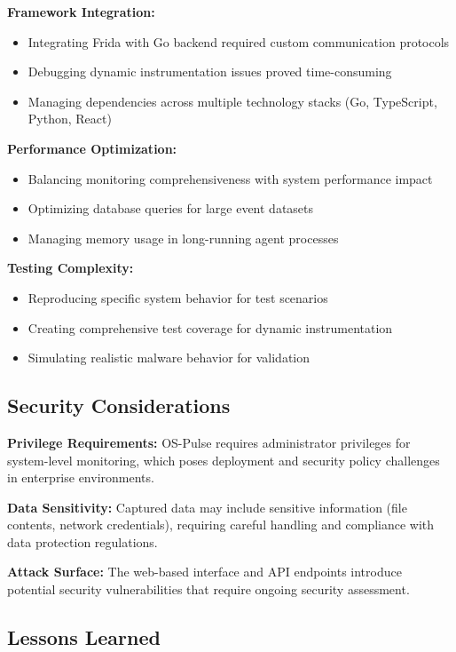 \textbf{Framework Integration:}
\begin{itemize}
    \item Integrating Frida with Go backend required custom communication protocols
    \item Debugging dynamic instrumentation issues proved time-consuming
    \item Managing dependencies across multiple technology stacks (Go, TypeScript, Python, React)
\end{itemize}

\textbf{Performance Optimization:}
\begin{itemize}
    \item Balancing monitoring comprehensiveness with system performance impact
    \item Optimizing database queries for large event datasets
    \item Managing memory usage in long-running agent processes
\end{itemize}

\textbf{Testing Complexity:}
\begin{itemize}
    \item Reproducing specific system behavior for test scenarios
    \item Creating comprehensive test coverage for dynamic instrumentation
    \item Simulating realistic malware behavior for validation
\end{itemize}

\subsection{Security Considerations}

\textbf{Privilege Requirements:}
OS-Pulse requires administrator privileges for system-level monitoring, which poses deployment and security policy challenges in enterprise environments.

\textbf{Data Sensitivity:}
Captured data may include sensitive information (file contents, network credentials), requiring careful handling and compliance with data protection regulations.

\textbf{Attack Surface:}
The web-based interface and API endpoints introduce potential security vulnerabilities that require ongoing security assessment.

\subsection{Lessons Learned}

